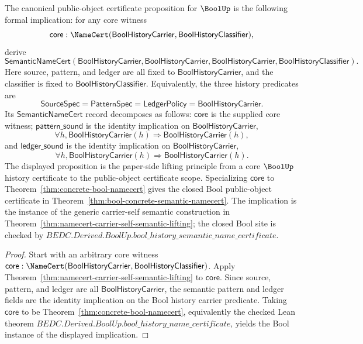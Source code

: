 \begin{theorem}
\label{thm:bool-semantic-namecert-target}
The canonical public-object certificate proposition for $\BoolUp$ is the
following formal implication: for any core witness
$$
\mathsf{core}:
\NameCert(\mathsf{BoolHistoryCarrier},\mathsf{BoolHistoryClassifier}),
$$
derive
$$
\mathsf{SemanticNameCert}(\mathsf{BoolHistoryCarrier},\mathsf{BoolHistoryCarrier},
\mathsf{BoolHistoryCarrier},\mathsf{BoolHistoryClassifier}).
$$
Here source, pattern, and ledger are all fixed to
$\mathsf{BoolHistoryCarrier}$, and the classifier is fixed to
$\mathsf{BoolHistoryClassifier}$. Equivalently, the three history predicates are
$$
\mathsf{SourceSpec}
=
\mathsf{PatternSpec}
=
\mathsf{LedgerPolicy}
=
\mathsf{BoolHistoryCarrier}.
$$
Its $\mathsf{SemanticNameCert}$ record decomposes as follows:
$\mathsf{core}$ is the supplied core witness;
$\mathsf{pattern\_sound}$ is the identity implication on
$\mathsf{BoolHistoryCarrier}$,
$$
\forall h,
\mathsf{BoolHistoryCarrier}(h)
\Rightarrow
\mathsf{BoolHistoryCarrier}(h),
$$
and $\mathsf{ledger\_sound}$ is the identity implication on
$\mathsf{BoolHistoryCarrier}$,
$$
\forall h,
\mathsf{BoolHistoryCarrier}(h)
\Rightarrow
\mathsf{BoolHistoryCarrier}(h).
$$
The displayed proposition is the paper-side lifting principle from a core
$\BoolUp$ history certificate to the public-object certificate scope.
Specializing $\mathsf{core}$ to Theorem~\ref{thm:concrete-bool-namecert} gives
the closed Bool public-object certificate in
Theorem~\ref{thm:bool-concrete-semantic-namecert}. The implication is the
instance of the generic carrier-self semantic construction in
Theorem~\ref{thm:namecert-carrier-self-semantic-lifting}; the closed Bool site
is checked by
$BEDC.Derived.BoolUp.bool\_history\_semantic\_name\_certificate$.
\end{theorem}
\begin{proof}
Start with an arbitrary core witness
$\mathsf{core}:\NameCert(\mathsf{BoolHistoryCarrier},
\mathsf{BoolHistoryClassifier})$. Apply
Theorem~\ref{thm:namecert-carrier-self-semantic-lifting} to
$\mathsf{core}$. Since source, pattern, and ledger are all
$\mathsf{BoolHistoryCarrier}$, the semantic pattern and ledger fields are the
identity implication on the Bool history carrier predicate. Taking
$\mathsf{core}$ to be Theorem~\ref{thm:concrete-bool-namecert}, equivalently
the checked Lean theorem
$BEDC.Derived.BoolUp.bool\_history\_name\_certificate$, yields the Bool
instance of the displayed implication.
\end{proof}

